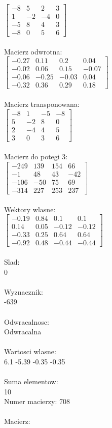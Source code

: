 \documentclass[a4paper,12pt]{article}
\begin{document}
$\begin{bmatrix} -8&5&2&3\\1&-2&-4&0\\-5&8&4&3\\-8&0&5&6 \end{bmatrix}$
\\
\\
Macierz odwrotna:\\

$\begin{bmatrix} -0.27&0.11&0.2&0.04\\-0.02&0.06&0.15&-0.07\\-0.06&-0.25&-0.03&0.04\\-0.32&0.36&0.29&0.18 \end{bmatrix}$
\\
\\
Macierz transponowana:\\

$\begin{bmatrix} -8&1&-5&-8\\5&-2&8&0\\2&-4&4&5\\3&0&3&6 \end{bmatrix}$
\\
\\
Macierz do potegi 3:\\

$\begin{bmatrix} -249&139&154&66\\-1&48&43&-42\\-106&-50&75&69\\-314&227&253&237 \end{bmatrix}$
\\
\\
Wektory wlasne:\\

$\begin{bmatrix} -0.19&0.84&0.1&0.1\\0.14&0.05&-0.12&-0.12\\-0.33&0.25&0.64&0.64\\-0.92&0.48&-0.44&-0.44 \end{bmatrix}$
\\
\\
Slad:\\
0
\\
\\
Wyznacznik:\\
-639
\\
\\
Odwracalnosc:\\
Odwracalna
\\
\\
Wartosci wlasne:\\
6.1 -5.39 -0.35 -0.35
\\
\\
Suma elementow:\\
10
\\
\newpage
Numer macierzy:
708
\\
\\
Macierz:\\
\end{document}
